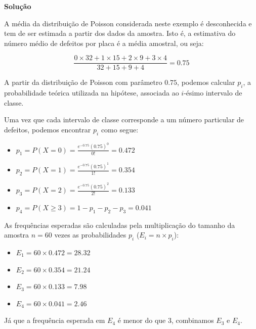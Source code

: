 \documentclass[
]{book}
\providecommand{\tightlist}{%
  \setlength{\itemsep}{0pt}\setlength{\parskip}{0pt}}
\begin{document}
\textbf{Solução}

A média da distribuição de Poisson considerada neste exemplo é desconhecida e tem de ser estimada a partir dos dados da amostra. Isto é, a estimativa do número médio de defeitos por placa é a média amostral, ou seja:

\[\frac{0\times32+1\times15+2\times9+3\times4}{32+15+9+4}=0.75\]

A partir da distribuição de Poisson com parâmetro \(0.75\), podemos calcular \(p_i\), a probabilidade teórica utilizada na hipótese, associada ao \(i\)-ésimo intervalo de classe.

Uma vez que cada intervalo de classe corresponde a um número particular de defeitos, podemos encontrar \(p_i\) como segue:

\begin{itemize}
\tightlist
\item
  \(p_1=P(X=0)=\frac{e^{-0.75}(0.75)^0}{0!}=0.472\)
\item
  \(p_2=P(X=1)=\frac{e^{-0.75}(0.75)^1}{1!}=0.354\)
\item
  \(p_3=P(X=2)=\frac{e^{-0.75}(0.75)^2}{2!}=0.133\)
\item
  \(p_4=P(X\geq3)=1-p_1-p_2-p_3=0.041\)
\end{itemize}

As frequências esperadas são calculadas pela multiplicação do tamanho da amostra \(n=60\) vezes as probabilidades \(p_i\) (\(E_i=n\times p_i\)):

\begin{itemize}
\tightlist
\item
  \(E_1=60\times0.472=28.32\)
\item
  \(E_2=60\times0.354=21.24\)
\item
  \(E_3=60\times0.133=7.98\)
\item
  \(E_4=60\times0.041=2.46\)
\end{itemize}

Já que a frequência esperada em \(E_4\) é menor do que 3, combinamos \(E_3\) e \(E_4\).
\end{document}

